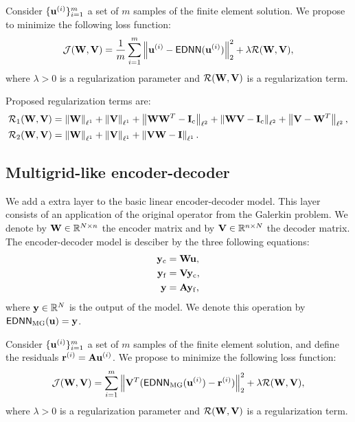 Consider \( \{ \mathbf{u}^{(i)} \}_{i=1}^{m} \) a set of \(m\) samples of the finite element solution.
We propose to minimize the following loss function:
\begin{equation}
    \mathcal{J}(\mathbf{W}, \mathbf{V}) =
    \frac{1}{m} \sum_{i=1}^{m} \left\| \mathbf{u}^{(i)} - \mathsf{EDNN}(\mathbf{u}^{(i)}) \right\|_2^2 +
    \lambda \mathcal{R}(\mathbf{W}, \mathbf{V}),
\end{equation}
where \(\lambda > 0\) is a regularization parameter and \(\mathcal{R}(\mathbf{W}, \mathbf{V})\) is a regularization term.

Proposed regularization terms are:
\begin{subequations}
    \begin{align}
        \mathcal{R}_1(\mathbf{W}, \mathbf{V}) &
        = \left\lVert \mathbf{W}  \right\rVert_{\ell^1} + \left\lVert \mathbf{V}  \right\rVert_{\ell^1}
        + \left\lVert \mathbf{W} \mathbf{W}^T - \mathbf{I}_\mathrm{c}  \right\rVert_{\ell^2}
        + \left\lVert \mathbf{W} \mathbf{V} - \mathbf{I}_\mathrm{c}  \right\rVert_{\ell^2}
        + \left\lVert \mathbf{V} - \mathbf{W}^T  \right\rVert_{\ell^2}, \\
        \mathcal{R}_2(\mathbf{W}, \mathbf{V}) &
        = \left\lVert \mathbf{W}  \right\rVert_{\ell^1} + \left\lVert \mathbf{V}  \right\rVert_{\ell^1}
        + \left\lVert \mathbf{V} \mathbf{W} - \mathbf{I}  \right\rVert_{\ell^1}.
    \end{align}
\end{subequations}

\subsection{Multigrid-like encoder-decoder}

We add a extra layer to the basic linear encoder-decoder model.
This layer consists of an application of the original operator from the Galerkin problem.
We denote by \(\mathbf{W} \in \mathbb{R}^{N \times n}\) the encoder matrix and by \(\mathbf{V} \in \mathbb{R}^{n \times N}\) the decoder matrix.
The encoder-decoder model is desciber by the three following equations:
\begin{subequations}
    \begin{align}
        \mathbf{y}_\mathrm{c} & = \mathbf{W} \mathbf{u}, \\
        \mathbf{y}_\mathrm{f} & = \mathbf{V} \mathbf{y}_\mathrm{c}, \\
        \mathbf{y} & = \mathbf{A} \mathbf{y}_\mathrm{f},
    \end{align}
\end{subequations}
where \(\mathbf{y} \in \mathbb{R}^{N}\) is the output of the model.
We denote this operation by \(\mathsf{EDNN}_\mathrm{MG}(\mathbf{u}) = \mathbf{y}\).

Consider \( \{ \mathbf{u}^{(i)} \}_{i=1}^{m} \) a set of \(m\) samples of the finite element solution, and define the residuals \(\mathbf{r}^{(i)} = \mathbf{A} \mathbf{u}^{(i)}\).
We propose to minimize the following loss function:
\begin{equation}
    \mathcal{J}(\mathbf{W}, \mathbf{V}) =
    \sum_{i=1}^{m} \left\lVert \mathbf{V}^T( \mathsf{EDNN}_\mathrm{MG}(\mathbf{u}^{(i)}) - \mathbf{r}^{(i)} )  \right\rVert_2^2 +
    \lambda \mathcal{R}(\mathbf{W}, \mathbf{V}),
\end{equation}
where \(\lambda > 0\) is a regularization parameter and \(\mathcal{R}(\mathbf{W}, \mathbf{V})\) is a regularization term.

